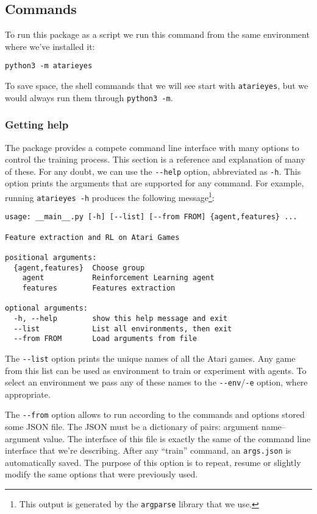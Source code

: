 \subsection{Commands}

To run this package as a script we run this command from the same environment
where we've installed it:
\begin{lstlisting}
python3 -m atarieyes
\end{lstlisting}
To save space, the shell commands that we will see start with
\texttt{atarieyes}, but we would always run them through
\lstinline[style=inlinesh]|python3 -m|.

\subsubsection*{Getting help}

The package provides a compete command line interface with many options to
control the training process. This section is a reference and explanation of
many of these. For any doubt, we can use the \verb|--help| option, abbreviated
as \verb|-h|. This option prints the arguments that are supported for any
command. For example, running \lstinline[style=inlinesh]{atarieyes -h}
produces the following message\footnote{This output is generated by the
\texttt{argparse} library that we use.}:
\begin{lstlisting}[language={}]
usage: __main__.py [-h] [--list] [--from FROM] {agent,features} ...

Feature extraction and RL on Atari Games

positional arguments:
  {agent,features}  Choose group
    agent           Reinforcement Learning agent
    features        Features extraction

optional arguments:
  -h, --help        show this help message and exit
  --list            List all environments, then exit
  --from FROM       Load arguments from file
\end{lstlisting}

The \verb|--list| option prints the unique names of all the Atari games. Any
game from this list can be used as environment to train or experiment with
agents. To select an environment we pass any of these names to the
\verb|--env|/\texttt{-e} option, where appropriate.

The \verb|--from| option allows to run according to the commands and options
stored some JSON file. The JSON must be a dictionary of pairs: argument
name--argument value. The interface of this file is exactly the same of the
command line interface that we're describing. After any ``train'' command, an
\verb|args.json| is automatically saved. The purpose of this option is to
repeat, resume or slightly modify the same options that were previously used.

